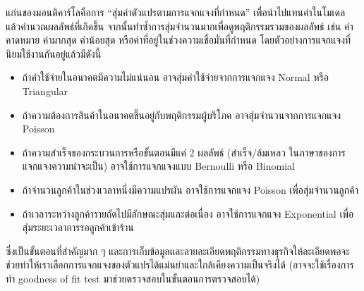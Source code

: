 แก่นของมอนติคาร์โลคือการ “สุ่มค่าตัวแปรตามการแจกแจงที่กำหนด” เพื่อนำไปแทนค่าในโมเดล แล้วคำนวณผลลัพธ์ที่เกิดขึ้น จากนั้นทำซ้ำการสุ่มจำนวนมากเพื่อดูพฤติกรรมรวมของผลลัพธ์ เช่น ค่าคาดหมาย ค่ามากสุด ค่าน้อยสุด หรือค่าที่อยู่ในช่วงความเชื่อมั่นที่กำหนด โดยตัวอย่างการแจกแจงที่นิยมใช้งานกันอยู่แล้วมีดังนี้
\begin{itemize}
    \item ถ้าค่าใช้จ่ายในอนาคตมีความไม่แน่นอน อาจสุ่มค่าใช้จ่ายจากการแจกแจง Normal หรือ Triangular
    \item ถ้าความต้องการสินค้าในอนาคตขึ้นอยู่กับพฤติกรรมผู้บริโภค อาจสุ่มจำนวนจากการแจกแจง Poisson
    \item ถ้าความสำเร็จของกระบวนการหรือขั้นตอนมีแค่ 2 ผลลัพธ์ (สำเร็จ/ล้มเหลว ในภาษาของการแจกแจงความน่าจะเป็น) อาจใช้การแจกแจงแบบ Bernoulli หรือ Binomial
    \item ถ้าจำนวนลูกค้าในช่วงเวลาหนึ่งมีความแปรผัน อาจใช้การแจกแจง Poisson เพื่อสุ่มจำนวนลูกค้า
    \item ถ้าเวลาระหว่างลูกค้ารายถัดไปมีลักษณะสุ่มและต่อเนื่อง อาจใช้การแจกแจง Exponential เพื่อสุ่มระยะเวลาการรอลูกค้าเข้าร้าน
\end{itemize}
ซึ่งเป็นขั้นตอนที่สำคัญมาก ๆ และการเก็บข้อมูลและลายละเอียดพฤติกรรมทางธุรกิจให้ละเอียดพอจะช่วยทำให้เราเลือกการแจกแจงของตัวแปรได้แม่นยำและใกล้เคียงความเป็นจริงได้ (อาจจะใช้เรื่องการทำ goodness of fit test มาช่วยตรวจสอบในขั้นตอนการตรวจสอบได้)

